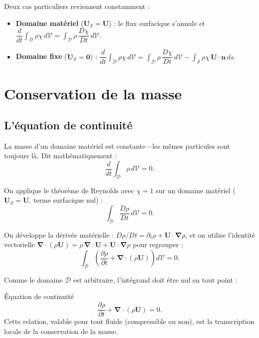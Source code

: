 \documentclass[11pt,a4paper]{report}
\newcommand{\pd}[2]{\dfrac{\partial #1}{\partial #2}}
\begin{document}
Deux cas particuliers reviennent constamment :

\begin{itemize}
    \item \textbf{Domaine matériel} ($\bm{U}_\mathcal{S} = \bm{U}$) : le flux
    surfacique s'annule et $\dfrac{d}{dt}\displaystyle\int_{\mathcal{D}} \rho\chi\,d\mathcal{V}
    = \displaystyle\int_{\mathcal{D}} \rho\,\dfrac{D\chi}{Dt}\,d\mathcal{V}$.

    \item \textbf{Domaine fixe} ($\bm{U}_\mathcal{S} = \bm{0}$) :
    $\dfrac{d}{dt}\displaystyle\int_{\mathcal{D}} \rho\chi\,d\mathcal{V}
    = \displaystyle\int_{\mathcal{D}} \rho\,\dfrac{D\chi}{Dt}\,d\mathcal{V}
    - \displaystyle\int_{\mathcal{S}} \rho\chi\,\bm{U}\cdot\bm{n}\,ds$.
\end{itemize}

\section{Conservation de la masse}

\subsection{L'équation de continuité}

La masse d'un domaine matériel est constante---les mêmes particules sont toujours
là. Dit mathématiquement :
\[
    \frac{d}{dt}\int_{\mathcal{D}} \rho\,d\mathcal{V} = 0.
\]

On applique le théorème de Reynolds avec $\chi = 1$ sur un domaine matériel
($\bm{U}_\mathcal{S} = \bm{U}$, terme surfacique nul) :
\[
    \int_{\mathcal{D}} \frac{D\rho}{Dt}\,d\mathcal{V} = 0.
\]

On développe la dérivée matérielle :
$D\rho/Dt = \partial_t\rho + \bm{U}\cdot\boldsymbol{\nabla}\rho$, et on utilise
l'identité vectorielle
$\boldsymbol{\nabla}\cdot(\rho\bm{U}) = \rho\,\boldsymbol{\nabla}\cdot\bm{U}
+ \bm{U}\cdot\boldsymbol{\nabla}\rho$
pour regrouper :
\[
    \int_{\mathcal{D}} \left(\pd{\rho}{t} + \boldsymbol{\nabla}\cdot(\rho\bm{U})\right)d\mathcal{V} = 0.
\]

Comme le domaine $\mathcal{D}$ est arbitraire, l'intégrand doit être nul en tout
point :

\begin{importantbox}{Équation de continuité}
\[
    \pd{\rho}{t} + \boldsymbol{\nabla}\cdot(\rho\bm{U}) = 0.
\]
Cette relation, valable pour tout fluide (compressible ou non), est la transcription
locale de la conservation de la masse.
\end{importantbox}
\end{document}
